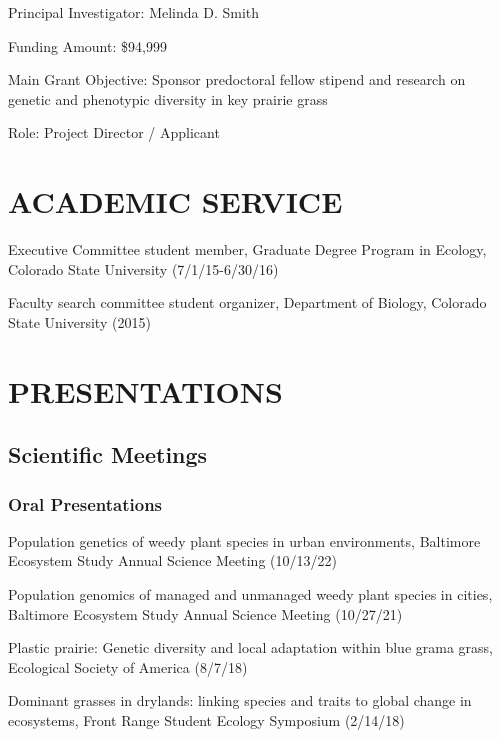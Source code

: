 \documentclass{cv}
\begin{document}
Principal Investigator: Melinda D. Smith

Funding Amount: \$94,999

Main Grant Objective: Sponsor predoctoral fellow stipend and research on genetic and phenotypic diversity in key prairie grass

Role: Project Director / Applicant


\section*{ACADEMIC SERVICE}

Executive Committee student member, Graduate Degree Program in Ecology, Colorado State University (7/1/15-6/30/16)

Faculty search committee student organizer, Department of Biology, Colorado State University (2015)


\section*{PRESENTATIONS}

\subsection*{Scientific Meetings}

\subsubsection*{Oral Presentations}

Population genetics of weedy plant species in urban environments, Baltimore Ecosystem Study Annual Science Meeting (10/13/22)

Population genomics of managed and unmanaged weedy plant species in cities, Baltimore Ecosystem Study Annual Science Meeting (10/27/21)

Plastic prairie: Genetic diversity and local adaptation within blue grama grass, Ecological Society of America (8/7/18)

Dominant grasses in drylands: linking species and traits to global change in ecosystems, Front Range Student Ecology Symposium (2/14/18)
\end{document}
